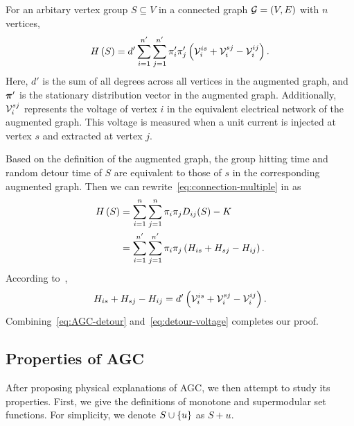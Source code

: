 \documentclass[10pt,twocolumn,twoside]{IEEEtran}
\begin{document}
\begin{theorem}\label{thm:connection-electrical}
    For an arbitary vertex group \(S\subseteq V\) in a connected graph \(\mathcal{G}=(V,E)\) with \(n\) vertices,
    \begin{equation}\label{eq:connection-electrical}
        H\left(S\right)=d'\sum_{i=1}^{n'}\sum_{j=1}^{n'}\pi'_i\pi'_j\left( \mathcal{V}_i^{is}+\mathcal{V}_i^{sj}-\mathcal{V}_i^{ij} \right).
    \end{equation}
    Here, \(d'\) is the sum of all degrees across all vertices in the augmented graph, and \(\boldsymbol{\pi}'\) is the stationary distribution vector in the augmented graph.
    Additionally, \(\mathcal{V}_i^{sj}\) represents the voltage of vertex \(i\) in the equivalent electrical network of the augmented graph.
    This voltage is measured when a unit current is injected at vertex \(s\) and extracted at vertex \(j\).
\end{theorem}
\begin{IEEEproof}
    Based on the definition of the augmented graph, the group hitting time and random detour time of \(S\) are equivalent to those of \(s\) in the corresponding augmented graph.
    Then we can rewrite~\eqref{eq:connection-multiple} in  as
    \begin{equation}\label{eq:AGC-detour}
        \begin{split}
            H\left(S\right)&=\sum_{i=1}^n\sum_{j=1}^n\pi_i\pi_jD_{ij}(S)-K\\
            &=\sum_{i=1}^{n'}\sum_{j=1}^{n'}\pi_i\pi_j\left( H_{is}+H_{sj}-H_{ij} \right).
        \end{split}
    \end{equation}
    According to~\cite{RaZh13},
    \begin{equation}\label{eq:detour-voltage}
        H_{is}+H_{sj}-H_{ij}=d'\left( \mathcal{V}_i^{is}+\mathcal{V}_i^{sj}-\mathcal{V}_i^{ij} \right).
    \end{equation}
    Combining~\eqref{eq:AGC-detour} and~\eqref{eq:detour-voltage} completes our proof.
\end{IEEEproof}


\subsection{Properties of AGC}

After proposing physical explanations of AGC, we then attempt to study its properties.
First, we give the definitions of monotone and supermodular set functions. For simplicity, we denote \(S\cup\left\{u \right\}\) as \(S+u\).
\end{document}
